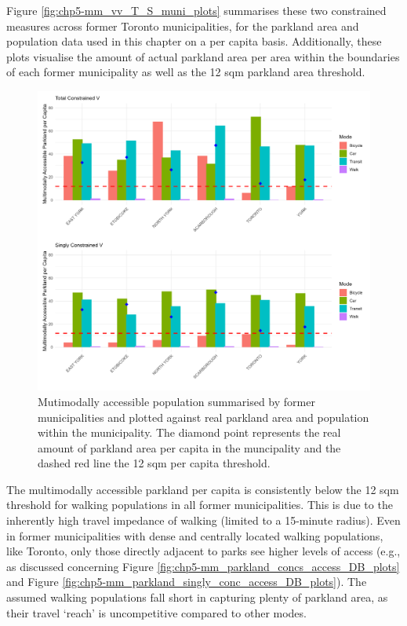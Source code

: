 \documentclass[
11pt, %
oneside, %
english, %
singlespacing, %
]{macthesis} %
\begin{document}
Figure \ref{fig:chp5-mm_vv_T_S_muni_plots} summarises these two constrained measures across former Toronto municipalities, for the parkland area and population data used in this chapter on a per capita basis. Additionally, these plots visualise the amount of actual parkland area per area within the boundaries of each former municipality as well as the 12 sqm parkland area threshold.

\begin{figure}

{\centering \includegraphics[width=6in]{./data/figures/chp5-mm_vv_T_S_muni_plots} 

}

\caption{\label{fig:chp5-mm_vv_T_S_muni_plots} Mutimodally accessible population summarised by former municipalities and plotted against real parkland area and population within the municipality. The diamond point represents the real amount of parkland area per capita in the muncipality and the dashed red line the 12 sqm per capita threshold.}\label{fig:unnamed-chunk-89}
\end{figure}

The multimodally accessible parkland per capita is consistently below the 12 sqm threshold for walking populations in all former municipalities. This is due to the inherently high travel impedance of walking (limited to a 15-minute radius). Even in former municipalities with dense and centrally located walking populations, like Toronto, only those directly adjacent to parks see higher levels of access (e.g., as discussed concerning Figure \ref{fig:chp5-mm_parkland_concs_access_DB_plots} and Figure \ref{fig:chp5-mm_parkland_singly_conc_access_DB_plots}). The assumed walking populations fall short in capturing plenty of parkland area, as their travel `reach' is uncompetitive compared to other modes.
\end{document}
